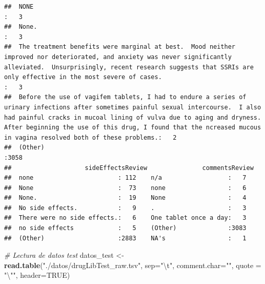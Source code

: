\documentclass[spanish,]{article}
\newenvironment{Shaded}{\begin{snugshade}}{\end{snugshade}}
\newcommand{\CharTok}[1]{\textcolor[rgb]{0.31,0.60,0.02}{#1}}
\newcommand{\CommentTok}[1]{\textcolor[rgb]{0.56,0.35,0.01}{\textit{#1}}}
\newcommand{\DataTypeTok}[1]{\textcolor[rgb]{0.13,0.29,0.53}{#1}}
\newcommand{\KeywordTok}[1]{\textcolor[rgb]{0.13,0.29,0.53}{\textbf{#1}}}
\newcommand{\NormalTok}[1]{#1}
\newcommand{\OtherTok}[1]{\textcolor[rgb]{0.56,0.35,0.01}{#1}}
\newcommand{\StringTok}[1]{\textcolor[rgb]{0.31,0.60,0.02}{#1}}
\begin{document}
\begin{verbatim}
##  NONE                                                                                                                                                                                                                                                                                                                           :   3  
##  None.                                                                                                                                                                                                                                                                                                                          :   3  
##  The treatment benefits were marginal at best.  Mood neither improved nor deteriorated, and anxiety was never significantly alleviated.  Unsurprisingly, recent research suggests that SSRIs are only effective in the most severe of cases.                                                                                    :   3  
##  Before the use of vagifem tablets, I had to endure a series of urinary infections after sometimes painful sexual intercourse.  I also had painful cracks in mucoal lining of vulva due to aging and dryness.  After beginning the use of this drug, I found that the ncreased mucous in vagina resolved both of these problems.:   2  
##  (Other)                                                                                                                                                                                                                                                                                                                        :3058  
##                    sideEffectsReview               commentsReview
##  none                       : 112    n/a                  :   7  
##  None                       :  73    none                 :   6  
##  None.                      :  19    None                 :   4  
##  No side effects.           :   9    .                    :   3  
##  There were no side effects.:   6    One tablet once a day:   3  
##  no side effects            :   5    (Other)              :3083  
##  (Other)                    :2883    NA's                 :   1
\end{verbatim}

\begin{Shaded}
\begin{Highlighting}[]
\CommentTok{# Lectura de datos test}
\NormalTok{datos_test <-}\StringTok{ }\KeywordTok{read.table}\NormalTok{(}\StringTok{"./datos/drugLibTest_raw.tsv"}\NormalTok{, }\DataTypeTok{sep=}\StringTok{"}\CharTok{\textbackslash{}t}\StringTok{"}\NormalTok{, }\DataTypeTok{comment.char=}\StringTok{""}\NormalTok{,}
                         \DataTypeTok{quote =} \StringTok{"}\CharTok{\textbackslash{}"}\StringTok{"}\NormalTok{, }\DataTypeTok{header=}\OtherTok{TRUE}\NormalTok{)}
\end{Highlighting}
\end{Shaded}
\end{document}
